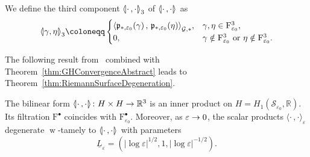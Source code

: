 \documentclass[AHL,Unicode,longabstracts]{cedram}
\newcommand{\innone}[2]{{\langle#2\rangle_{#1}}}
\newcommand{\binnone}[2]{{\left\langle#2\right\rangle_{#1}}}
\newcommand{\llangle}{\mathopen{\langle\mkern -3.1mu\lvert}}
\newcommand{\rrangle}{\mathclose{\rvert\mkern -3.1mu\rangle}}
\newcommand{\highinn}[2]{{\llangle#2\rrangle_{#1}}}
\DeclareMathOperator{\weak}{w}
\newcommand{\filter}{\mathrm{F}}
\newcommand{\R}{\mathbb{R}}
\newcommand{\mgr}{\mathcal{G}}
\newcommand{\rsf}{\mathcal{S}}
\newcommand{\proj}{\mathfrak{p}}
\renewcommand*{\to}{\mathchoice{\longrightarrow}{\rightarrow}{\rightarrow}{\rightarrow}}
\begin{document}
We define the third component $\highinn{3}{\cdot \,, \cdot}$ of $\highinn{}{\cdot \,, \cdot}$ as
\[
\highinn{3}{\gamma, \eta} \coloneqq
\begin{cases}
\binnone{\mgr, \ast}{\proj_{\ast, \varepsilon_0} (\gamma) \,, \, \proj_{\ast, \varepsilon_0} (\eta)}, & \gamma, \eta \in \filter^{3}_{\varepsilon_0}, \\
0, & \gamma\notin \filter^{3}_{\varepsilon_0} \text{ or }\eta\notin \filter^{3}_{\varepsilon_0}.
\end{cases}
\]

The following result from~\cite{AN-AG-hybrid} combined with Theorem~\ref{thm:GHConvergenceAbstract} leads to Theorem~\ref{thm:RiemannSurfaceDegeneration}.

\begin{prop}\label{prop:DegeneratingSurfaceWeakTameness}
The bilinear form $\highinn{}{\cdot \,, \cdot} \colon H \times H \to \R^3$ is an inner product on $H = H_1(\rsf_{\varepsilon_0}, \R)$. Its filtration $\filter^\bullet$ coincides with $\filter^\bullet_{\varepsilon_0}$. Moreover, as $\varepsilon \to 0$, the scalar products $\innone{\varepsilon}{\cdot \,, \cdot}$ degenerate $\weak$-tamely to $\highinn{}{\cdot \,, \cdot}$ with parameters
\[
\underline L_\varepsilon = \left(|\log\varepsilon|^{1/2}, 1, |\log\varepsilon|^{-1/2}\right).
\]
\end{prop}
\end{document}
